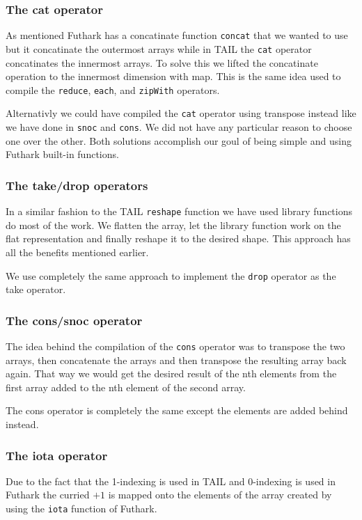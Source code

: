 \documentclass[11pt]{article}
\begin{document}
\subsubsection{The cat operator} 
As mentioned Futhark has a concatinate function {\tt concat} that we wanted to use but it concatinate the outermost arrays while in TAIL the {\tt cat} operator concatinates the innermost arrays. To solve this we lifted the concatinate operation to the innermost dimension with map. This is the same idea used to compile the {\tt reduce}, {\tt each}, and {\tt zipWith} operators. 

Alternativly we could have compiled the {\tt cat} operator using transpose instead like we have done in {\tt snoc} and {\tt cons}. We did not have any particular reason to choose one over the other. Both solutions accomplish our goul of being simple and using Futhark built-in functions. 

\subsubsection{The take/drop operators} 
In a similar fashion to the TAIL {\tt reshape} function we have used library functions do most of the work.
We flatten the array, let the library function work on the flat representation and finally reshape it to the desired shape.
This approach has all the benefits mentioned earlier.

We use completely the same approach to implement the {\tt drop} operator as the take operator.

\subsubsection{The cons/snoc operator}
The idea behind the compilation of the {\tt cons} operator was to transpose the two arrays,
then concatenate the arrays and then transpose the resulting array back again.
That way we would get the desired result of the nth elements from the first array added to the nth element of the second array.

The cons operator is completely the same except the elements are added behind instead.

\subsubsection{The iota operator} 
Due to the fact that the 1-indexing is used in TAIL and 0-indexing is used in Futhark the curried $+1$ is mapped onto the elements of the array created by using the {\tt iota} function of Futhark. 
\end{document}
